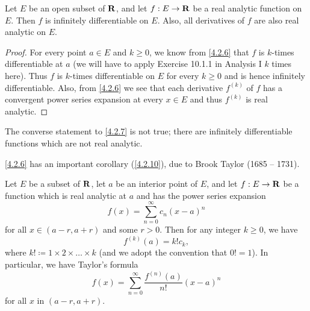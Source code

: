 \begin{corollary}\label{4.2.7}
  Let \(E\) be an open subset of \(\mathbf{R}\), and let \(f : E \to \mathbf{R}\) be a real analytic function on \(E\).
  Then \(f\) is infinitely differentiable on \(E\).
  Also, all derivatives of \(f\) are also real analytic on \(E\).
\end{corollary}

\begin{proof}
  For every point \(a \in E\) and \(k \geq 0\), we know from \cref{4.2.6} that \(f\) is \(k\)-times differentiable at \(a\)
  (we will have to apply Exercise 10.1.1 in Analysis I \(k\) times here).
  Thus \(f\) is \(k\)-times differentiable on \(E\) for every \(k \geq 0\) and is hence infinitely differentiable.
  Also, from \cref{4.2.6} we see that each derivative \(f^{(k)}\) of \(f\) has a convergent power series expansion at every \(x \in E\) and thus \(f^{(k)}\) is real analytic.
\end{proof}

\setcounter{theorem}{8}
\begin{remark}\label{4.2.9}
  The converse statement to \cref{4.2.7} is not true;
  there are infinitely differentiable functions which are not real analytic.
\end{remark}

\begin{note}
  \cref{4.2.6} has an important corollary (\cref{4.2.10}), due to Brook Taylor (1685 -- 1731).
\end{note}

\begin{corollary}\label{4.2.10}
  Let \(E\) be a subset of \(\mathbf{R}\), let \(a\) be an interior point of \(E\), and let \(f : E \to \mathbf{R}\) be a function which is real analytic at \(a\) and has the power series expansion
  \[
    f(x) = \sum_{n = 0}^\infty c_n (x - a)^n
  \]
  for all \(x \in (a - r, a + r)\) and some \(r > 0\).
  Then for any integer \(k \geq 0\), we have
  \[
    f^{(k)}(a) = k! c_k,
  \]
  where \(k! \coloneqq 1 \times 2 \times \dots \times k\)
  (and we adopt the convention that \(0! = 1\)).
  In particular, we have Taylor's formula
  \[
    f(x) = \sum_{n = 0}^\infty \frac{f^{(n)}(a)}{n!} (x - a)^n
  \]
  for all \(x\) in \((a - r, a + r)\).
\end{corollary}

